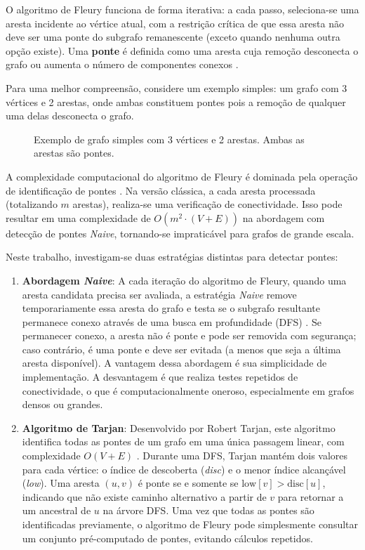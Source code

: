 \documentclass{sbc2023}%
\begin{document}
O algoritmo de Fleury funciona de forma iterativa: a cada passo, seleciona-se uma aresta incidente ao vértice atual, com a restrição crítica de que essa aresta não deve ser uma ponte do subgrafo remanescente (exceto quando nenhuma outra opção existe). Uma \textbf{ponte} é definida como uma aresta cuja remoção desconecta o grafo ou aumenta o número de componentes conexos \cite{diestel:2017}.

Para uma melhor compreensão, considere um exemplo simples: um grafo com 3 vértices e 2 arestas, onde ambas constituem pontes pois a remoção de qualquer uma delas desconecta o grafo.

\begin{figure}[H]
\centering
\resizebox{0.6\columnwidth}{!}{

}
\vspace{2mm}
\caption{Exemplo de grafo simples com 3 vértices e 2 arestas. Ambas as arestas são pontes.}
\label{fig:grafo-exemplo}
\end{figure}

A complexidade computacional do algoritmo de Fleury é dominada pela operação de identificação de pontes \cite{cormen:2009}. Na versão clássica, a cada aresta processada (totalizando $m$ arestas), realiza-se uma verificação de conectividade. Isso pode resultar em uma complexidade de $O(m^2 \cdot (V + E))$ na abordagem com detecção de pontes \textit{Naive}, tornando-se impraticável para grafos de grande escala.

Neste trabalho, investigam-se duas estratégias distintas para detectar pontes:

\begin{enumerate}
    \item \textbf{Abordagem \textit{Naive}}: A cada iteração do algoritmo de Fleury, quando uma aresta candidata precisa ser avaliada, a estratégia \textit{Naive} remove temporariamente essa aresta do grafo e testa se o subgrafo resultante permanece conexo através de uma busca em profundidade (DFS) \cite{cormen:2009}. Se permanecer conexo, a aresta não é ponte e pode ser removida com segurança; caso contrário, é uma ponte e deve ser evitada (a menos que seja a última aresta disponível). A vantagem dessa abordagem é sua simplicidade de implementação. A desvantagem é que realiza testes repetidos de conectividade, o que é computacionalmente oneroso, especialmente em grafos densos ou grandes.
    
    \item \textbf{Algoritmo de Tarjan}: Desenvolvido por Robert Tarjan, este algoritmo identifica todas as pontes de um grafo em uma única passagem linear, com complexidade $O(V + E)$ \cite{tarjan:1972}. Durante uma DFS, Tarjan mantém dois valores para cada vértice: o índice de descoberta (\textit{disc}) e o menor índice alcançável (\textit{low}). Uma aresta $(u,v)$ é ponte se e somente se $\mathrm{low}[v] > \mathrm{disc}[u]$, indicando que não existe caminho alternativo a partir de $v$ para retornar a um ancestral de $u$ na árvore DFS. Uma vez que todas as pontes são identificadas previamente, o algoritmo de Fleury pode simplesmente consultar um conjunto pré-computado de pontes, evitando cálculos repetidos.
\end{enumerate}
\end{document}

